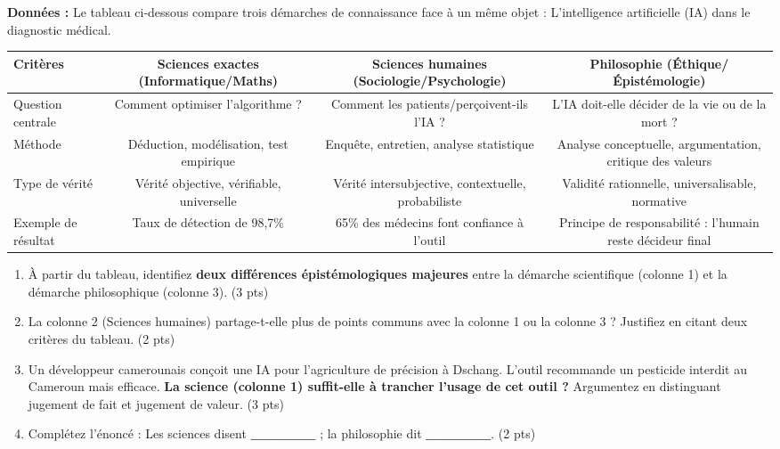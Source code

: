 \documentclass[11pt]{article}
\begin{document}
\begin{exercice}
\textbf{Données :} Le tableau ci-dessous compare trois démarches de connaissance face à un même objet : \og{}L'intelligence artificielle (IA) dans le diagnostic médical\fg{}.

\begin{tabularx}{\linewidth}{|X|c|c|c|}
\hline
\textbf{Critères} & \textbf{Sciences exactes (Informatique/Maths)} & \textbf{Sciences humaines (Sociologie/Psychologie)} & \textbf{Philosophie (Éthique/Épistémologie)} \\
\hline
Question centrale & Comment optimiser l'algorithme ? & Comment les patients/perçoivent-ils l'IA ? & L'IA doit-elle décider de la vie ou de la mort ? \\
\hline
Méthode & Déduction, modélisation, test empirique & Enquête, entretien, analyse statistique & Analyse conceptuelle, argumentation, critique des valeurs \\
\hline
Type de vérité & Vérité objective, vérifiable, universelle & Vérité intersubjective, contextuelle, probabiliste & Validité rationnelle, universalisable, normative \\
\hline
Exemple de résultat & Taux de détection de 98,7\% & 65\% des médecins font confiance à l'outil & Principe de responsabilité : l'humain reste décideur final \\
\hline
\end{tabularx}

\begin{enumerate}
    \item À partir du tableau, identifiez \textbf{deux différences épistémologiques majeures} entre la démarche scientifique (colonne 1) et la démarche philosophique (colonne 3). (3 pts)
    \item La colonne 2 (Sciences humaines) partage-t-elle plus de points communs avec la colonne 1 ou la colonne 3 ? Justifiez en citant deux critères du tableau. (2 pts)
    \item Un développeur camerounais conçoit une IA pour l'agriculture de précision à Dschang. L'outil recommande un pesticide interdit au Cameroun mais efficace. \textbf{La science (colonne 1) suffit-elle à trancher l'usage de cet outil ?} Argumentez en distinguant \og{}jugement de fait\fg{} et \og{}jugement de valeur\fg{}. (3 pts)
    \item Complétez l'énoncé : \og{}Les sciences disent \textbf{\_\_\_\_\_\_} ; la philosophie dit \textbf{\_\_\_\_\_\_}.\fg{} (2 pts)
\end{enumerate}
\end{exercice}
\end{document}
